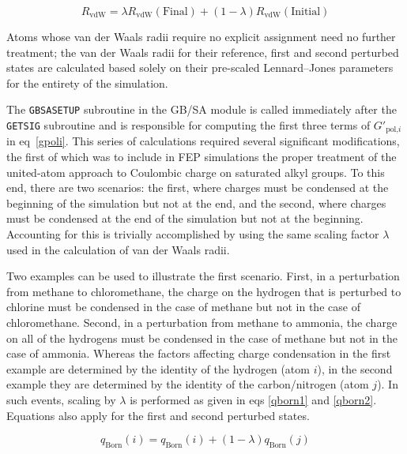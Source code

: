 \documentclass[12pt]{report}
\def\equlab{eq}\def\equslab{Eqs.}
\newcommand*\eq[1]{\equlab~\ref{#1}}
\begin{document}
\vspace*{-0.7cm}
\begin{equation}
\label{rvdwif}
R_{ \textrm{vdW}} = \lambda R_{ \textrm{vdW}}(\textrm{Final}) + (1 - \lambda) R_{ \textrm{vdW}}(\textrm{Initial})
\end{equation}

Atoms whose van der Waals radii require no explicit assignment need no further treatment; the van der Waals radii for their reference, first and second perturbed states are calculated based solely on their pre-scaled Lennard--Jones parameters for the entirety of the simulation.

The {\tt GBSASETUP} subroutine in the GB/SA module is called immediately after the {\tt GETSIG} subroutine and is responsible for computing the first three terms of $G'_{\textrm{pol,}i}$ in \eq{gpoli}. This series of calculations required several significant modifications, the first of which was to include in FEP simulations the proper treatment of the united-atom approach to Coulombic charge on saturated alkyl groups. To this end, there are two scenarios: the first, where charges must be condensed at the beginning of the simulation but not at the end, and the second, where charges must be condensed at the end of the simulation but not at the beginning. Accounting for this is trivially accomplished by using the same scaling factor $\lambda$ used in the calculation of van der Waals radii.

Two examples can be used to illustrate the first scenario. First, in a perturbation from methane to chloromethane, the charge on the hydrogen that is perturbed to chlorine must be condensed in the case of methane but not in the case of chloromethane. Second, in a perturbation from methane to ammonia, the charge on all of the hydrogens must be condensed in the case of methane but not in the case of ammonia. Whereas the factors affecting charge condensation in the first example are determined by the identity of the hydrogen (atom $i$), in the second example they are determined by the identity of the carbon/nitrogen (atom $j$). In such events, scaling by $\lambda$ is performed as given in eqs \ref{qborn1} and \ref{qborn2}. Equations also apply for the first and second perturbed states.

\vspace*{-0.4cm}
\begin{equation}
\label{qborn1}
q_{\textrm{Born}}(i) = q_{\textrm{Born}}(i) + (1 - \lambda) q_{\textrm{Born}}(j)
\end{equation}
\vspace*{-1.7cm}
\end{document}
